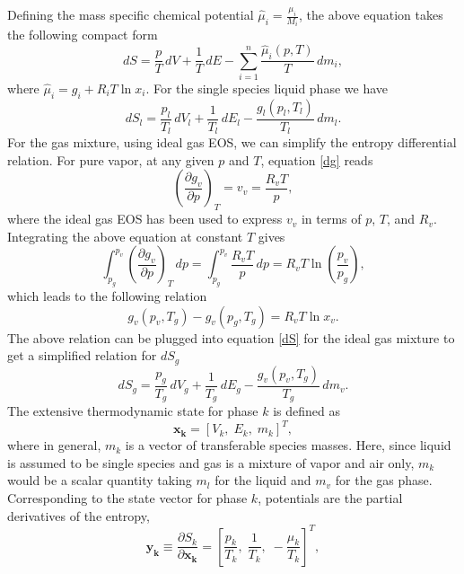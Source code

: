 Defining the mass specific chemical potential $\hat{\mu}_i = \frac{\mu_i}{M_i}$, the above equation takes the following compact form
\begin{equation}
d S = \frac pT\,d V + \frac1T\,d E - \sum_{i=1}^{n} \frac{\hat{\mu}_i(p,T)}{T} \,d m_i,
\end{equation}
where $\hat{\mu}_i = g_i + R_i T \ln{x_i}$. For the single species liquid phase we have
\begin{equation}\label{dS_l}
d S_l = \frac{p_l}{T_l}\,d V_l + \frac1{T_l}\,d E_l - \frac{g_l(p_l,T_l)}{T_l} \,d m_l.
\end{equation}
For the gas mixture, using ideal gas EOS, we can simplify the entropy differential relation. For pure vapor, at any given $p$ and $T$, equation \eqref{dg} reads
\begin{equation}
\left( \frac{\partial g_v}{\partial p} \right)_T = v_v = \frac{R_v T}{p},
\end{equation}
where the ideal gas EOS has been used to express $v_v$ in terms of $p$, $T$, and $R_v$. Integrating the above equation at constant $T$ gives
\begin{equation}
\int_{p_g}^{p_v} \left( \frac{\partial g_v}{\partial p} \right)_T \,dp = \int_{p_g}^{p_v} \frac{R_v T}{p} \,dp = R_v T \ln{\left(\frac{p_v}{p_g}\right)},
\end{equation}
which leads to the following relation
\begin{equation}
g_v\left(p_v,T_g\right) - g_v\left(p_g,T_g\right) = R_v T \ln{x_v}.
\end{equation}
The above relation can be plugged into equation \eqref{dS} for the ideal gas mixture to get a simplified relation for $dS_g$
\begin{equation}\label{dS_g}
d S_g = \frac{p_g}{T_g}\,d V_g + \frac1{T_g}\,d E_g - \frac{g_v(p_v,T_g)}{T_g} \,d m_v.
\end{equation}
The extensive thermodynamic state for phase $k$ is defined as
\begin{equation}\label{extensive_state}
\boldsymbol{x_k}=[V_k,\;E_k,\;m_k]^T,
\end{equation}
where in general, $m_k$ is a vector of transferable species masses. Here, since liquid is assumed to be single species and gas is a mixture of vapor and air only, $m_k$ would be a scalar quantity taking $m_l$ for the liquid and $m_v$ for the gas phase. Corresponding to the state vector for phase $k$, potentials are the partial derivatives of the entropy,
\begin{equation}\label{potentials}
\boldsymbol{y_k}\equiv\frac{\partial S_k}{\partial \boldsymbol{x_k}}=\left[\frac{p_k}{T_k},\;\frac{1}{T_k},\;-\frac{\hat{\mu_k}}{T_k}\right]^T,
\end{equation}
